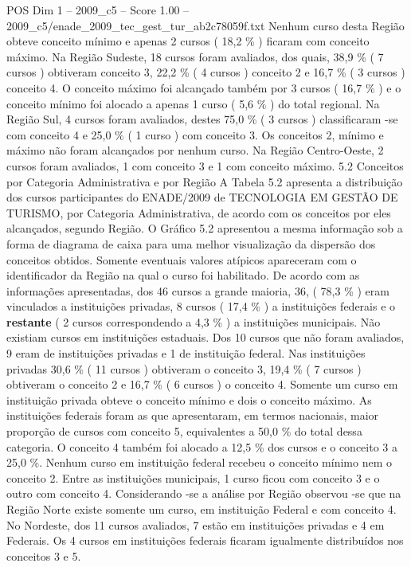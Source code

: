 \begin{textsample}{POS Dim 1 – 2009\_c5 – Score 1.00 – 2009\_c5/enade\_2009\_tec\_gest\_tur\_ab2c78059f.txt}
Nenhum curso desta Região obteve conceito mínimo e apenas 2 cursos ( 18,2 \% ) ficaram com conceito máximo.
Na Região Sudeste, 18 cursos foram avaliados, dos quais, 38,9 \% ( 7 cursos ) obtiveram conceito 3, 22,2 \% ( 4 cursos ) conceito 2 e 16,7 \% ( 3 cursos ) conceito 4.
O conceito máximo foi alcançado também por 3 cursos ( 16,7 \% ) e o conceito mínimo foi alocado a apenas 1 curso ( 5,6 \% ) do total regional.
Na Região Sul, 4 cursos foram avaliados, destes 75,0 \% ( 3 cursos ) classificaram -se com conceito 4 e 25,0 \% ( 1 curso ) com conceito 3.
Os conceitos 2, mínimo e máximo não foram alcançados por nenhum curso.
Na Região Centro-Oeste, 2 cursos foram avaliados, 1 com conceito 3 e 1 com conceito máximo. 5.2 Conceitos por Categoria Administrativa e por Região A Tabela 5.2 apresenta a distribuição dos cursos participantes do ENADE/2009 de TECNOLOGIA EM GESTÃO DE TURISMO, por Categoria Administrativa, de acordo com os conceitos por eles alcançados, segundo Região.
O Gráfico 5.2 apresentou a mesma informação sob a forma de diagrama de caixa para uma melhor visualização da dispersão dos conceitos obtidos.
Somente eventuais valores atípicos apareceram com o identificador da Região na qual o curso foi habilitado.
De acordo com as informações apresentadas, dos 46 cursos a grande maioria, 36, ( 78,3 \% ) eram vinculados a instituições privadas, 8 cursos ( 17,4 \% ) a instituições federais e o \textbf{restante} ( 2 cursos correspondendo a 4,3 \% ) a instituições municipais.
Não existiam cursos em instituições estaduais.
Dos 10 cursos que não foram avaliados, 9 eram de instituições privadas e 1 de instituição federal.
Nas instituições privadas 30,6 \% ( 11 cursos ) obtiveram o conceito 3, 19,4 \% ( 7 cursos ) obtiveram o conceito 2 e 16,7 \% ( 6 cursos ) o conceito 4.
Somente um curso em instituição privada obteve o conceito mínimo e dois o conceito máximo.
As instituições federais foram as que apresentaram, em termos nacionais, maior proporção de cursos com conceito 5, equivalentes a 50,0 \% do total dessa categoria.
O conceito 4 também foi alocado a 12,5 \% dos cursos e o conceito 3 a 25,0 \%.
Nenhum curso em instituição federal recebeu o conceito mínimo nem o conceito 2.
Entre as instituições municipais, 1 curso ficou com conceito 3 e o outro com conceito 4.
Considerando -se a análise por Região observou -se que na Região Norte existe somente um curso, em instituição Federal e com conceito 4.
No Nordeste, dos 11 cursos avaliados, 7 estão em instituições privadas e 4 em Federais.
Os 4 cursos em instituições federais ficaram igualmente distribuídos nos conceitos 3 e 5.

\end{textsample}
